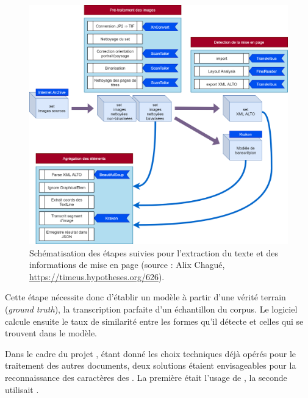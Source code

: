 \begin{figure}[t]
    \centering
    \includegraphics[width=15cm]{img/schema_lse_od2m.png}
    \caption[Schématisation des étapes suivies pour l’extraction du texte et des informations de mise en page]{Schématisation des étapes suivies pour l’extraction du texte et des informations de mise en page (source : Alix Chagué, \url{https://timeus.hypotheses.org/626}).}
    \label{fig:schema_lse_od2m}
\end{figure}

Cette étape nécessite donc d'établir un modèle à partir d'une \og vérité terrain \fg{} (\textit{ground truth}), \cad{} la transcription parfaite d'un échantillon du corpus. Le logiciel calcule ensuite le taux de similarité entre les formes qu'il détecte et celles qui se trouvent dans le modèle.

Dans le cadre du projet \timeus, étant donné les choix techniques déjà opérés pour le traitement des autres documents, deux solutions étaient envisageables pour la reconnaissance des caractères des \odm. La première était l'usage de \transkribus{}, la seconde utilisait \kraken{}.

